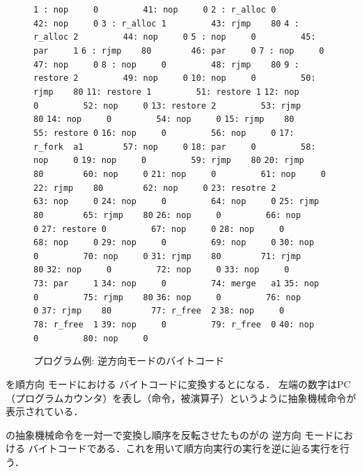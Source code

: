 \documentclass[submit,PRO]{ipsj}
\def\|{\verb|}
\begin{document}
\begin{figure}[tb]
\vbox{
\hbox{\|1 : nop     0         41: nop     0|}
\hbox{\|2 : r_alloc 0         42: nop     0|}
\hbox{\|3 : r_alloc 1         43: rjmp    80|}
\hbox{\|4 : r_alloc 2         44: nop     0|}
\hbox{\|5 : nop     0         45: par     1|}
\hbox{\|6 : rjmp    80        46: par     0|}
\hbox{\|7 : nop     0         47: nop     0|}
\hbox{\|8 : nop     0         48: rjmp    80|}
\hbox{\|9 : restore 2         49: nop     0|}
\hbox{\|10: nop     0         50: rjmp    80|}
\hbox{\|11: restore 1         51: restore 1|}
\hbox{\|12: nop     0         52: nop     0|}
\hbox{\|13: restore 2         53: rjmp    80|}
\hbox{\|14: nop     0         54: nop     0|}
\hbox{\|15: rjmp    80        55: restore 0|}
\hbox{\|16: nop     0         56: nop     0|}
\hbox{\|17: r_fork  a1        57: nop     0|}
\hbox{\|18: par     0         58: nop     0|}
\hbox{\|19: nop     0         59: rjmp    80|}
\hbox{\|20: rjmp    80        60: nop     0|}
\hbox{\|21: nop     0         61: nop     0|}
\hbox{\|22: rjmp    80        62: nop     0|}
\hbox{\|23: resotre 2         63: nop     0|}
\hbox{\|24: nop     0         64: nop     0|}
\hbox{\|25: rjmp    80        65: rjmp    80|}
\hbox{\|26: nop     0         66: nop     0|}
\hbox{\|27: restore 0         67: nop     0|}
\hbox{\|28: nop     0         68: nop     0|}
\hbox{\|29: nop     0         69: nop     0|}
\hbox{\|30: nop     0         70: nop     0|}
\hbox{\|31: rjmp    80        71: rjmp    80|}
\hbox{\|32: nop     0         72: nop     0|}
\hbox{\|33: nop     0         73: par     1|}
\hbox{\|34: nop     0         74: merge   a1|} 
\hbox{\|35: nop     0         75: rjmp    80|}
\hbox{\|36: nop     0         76: nop     0|}
\hbox{\|37: rjmp    80        77: r_free  2|}
\hbox{\|38: nop     0         78: r_free  1|}
\hbox{\|39: nop     0         79: r_free  0|}
\hbox{\|40: nop     0         80: nop     0|}
}
\centerline{}
\caption{プログラム例: 逆方向モードのバイトコード}%
\label{fig:backward}
\end{figure}

を順方向%
モードにおける%
バイトコードに変換するとになる．
左端の数字はPC（プログラムカウンタ）を表し（命令，被演算子）というように抽象機械命令が表示されている．

の抽象機械命令を一対一で変換し順序を反転させたものがの
逆方向%
モードにおける%
バイトコードである．これを用いて順方向実行の実行を逆に辿る実行を行う．
\end{document}

